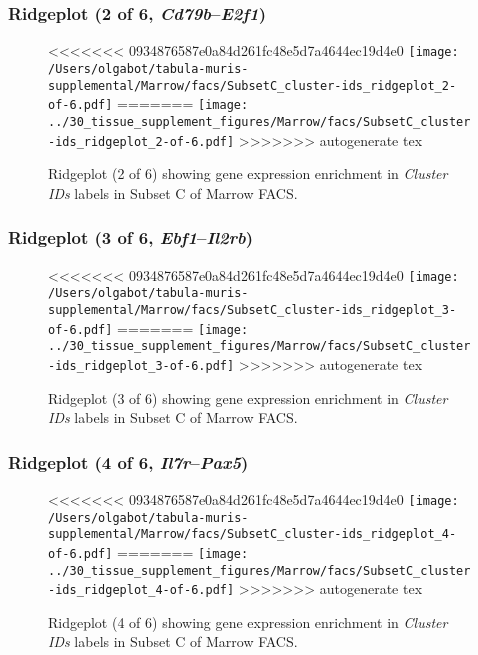 \clearpage

\subsubsection{Ridgeplot (2 of 6, \emph{Cd79b}--\emph{E2f1})}
\begin{figure}[h]
\centering
<<<<<<< 0934876587e0a84d261fc48e5d7a4644ec19d4e0
\texttt{[image: /Users/olgabot/tabula-muris-supplemental/Marrow/facs/SubsetC\_cluster-ids\_ridgeplot\_2-of-6.pdf]}
=======
\texttt{[image: ../30\_tissue\_supplement\_figures/Marrow/facs/SubsetC\_cluster-ids\_ridgeplot\_2-of-6.pdf]}
>>>>>>> autogenerate tex

\caption{ Ridgeplot (2 of 6)  showing gene expression enrichment in \emph{Cluster IDs} labels in Subset C of Marrow FACS. }
\end{figure}


\clearpage

\subsubsection{Ridgeplot (3 of 6, \emph{Ebf1}--\emph{Il2rb})}
\begin{figure}[h]
\centering
<<<<<<< 0934876587e0a84d261fc48e5d7a4644ec19d4e0
\texttt{[image: /Users/olgabot/tabula-muris-supplemental/Marrow/facs/SubsetC\_cluster-ids\_ridgeplot\_3-of-6.pdf]}
=======
\texttt{[image: ../30\_tissue\_supplement\_figures/Marrow/facs/SubsetC\_cluster-ids\_ridgeplot\_3-of-6.pdf]}
>>>>>>> autogenerate tex

\caption{ Ridgeplot (3 of 6)  showing gene expression enrichment in \emph{Cluster IDs} labels in Subset C of Marrow FACS. }
\end{figure}


\clearpage

\subsubsection{Ridgeplot (4 of 6, \emph{Il7r}--\emph{Pax5})}
\begin{figure}[h]
\centering
<<<<<<< 0934876587e0a84d261fc48e5d7a4644ec19d4e0
\texttt{[image: /Users/olgabot/tabula-muris-supplemental/Marrow/facs/SubsetC\_cluster-ids\_ridgeplot\_4-of-6.pdf]}
=======
\texttt{[image: ../30\_tissue\_supplement\_figures/Marrow/facs/SubsetC\_cluster-ids\_ridgeplot\_4-of-6.pdf]}
>>>>>>> autogenerate tex

\caption{ Ridgeplot (4 of 6)  showing gene expression enrichment in \emph{Cluster IDs} labels in Subset C of Marrow FACS. }
\end{figure}


